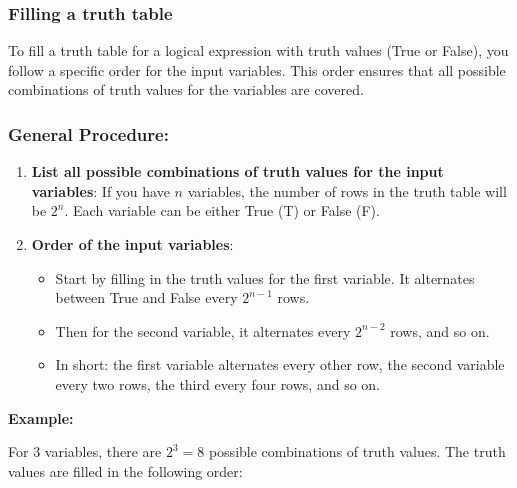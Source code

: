 \subsubsection{Filling a truth table}
To fill a truth table for a logical expression with truth values (True or False), you follow a 
specific order for the input variables. This order ensures that all possible combinations of truth values 
for the variables are covered.

\subsubsection{General Procedure:}

\begin{enumerate}

	\item \textbf{List all possible combinations of truth values for the input variables}: 
			If you have \(n\) variables, the number of rows in the truth table will be \(2^n\). Each 
			variable can be either True (T) or False (F).

	\item \textbf{Order of the input variables}:

			\begin{itemize}
					
				\item Start by filling in the truth values for the first variable. It alternates between 
					  True and False every \(2^{n-1}\) rows.
					
				\item Then for the second variable, it alternates every \(2^{n-2}\) rows, and so on.
					
				\item In short: the first variable alternates every other row, the second variable every two 
					rows, the third every four rows, and so on.
			
			\end{itemize}

\end{enumerate}

\textbf{Example: } 
\vspace{\baselineskip}

For 3 variables, there are \(2^3 = 8\) possible combinations of truth values. The truth values are filled 
in the following order:

